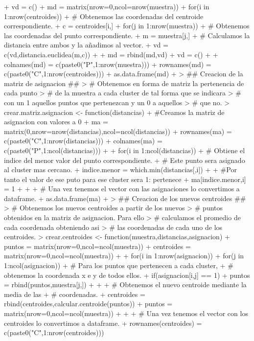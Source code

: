 \documentclass [a4paper] {article}
\begin{document}
\begin{footnotesize}
\begin{Schunk}
\begin{Sinput}
{+   vd = c()
+   md = matrix(nrow=0,ncol=nrow(muestra))
+   for(i in 1:nrow(centroides)){
+     # Obtenemos las coordenadas del centroide correspondiente.
+     c = centroides[i,]
+     for(j in 1:nrow(muestra)){
+       # Obtenemos las coordenadas del punto correspondiente.
+       m = muestra[j,]
+       # Calculamos la distancia entre ambos y la añadimos al vector.
+       vd = c(vd,distancia.euclidea(m,c))
+     }
+     md = rbind(md,vd)
+     vd = c()
+   }
+   colnames(md) = c(paste0("P",1:nrow(muestra)))
+   rownames(md) = c(paste0("C",1:nrow(centroides)))
+   as.data.frame(md)
+ }
> ## Creacion de la matriz de asignacion ##
> # Obtenemos en forma de matriz la pertenencia de cada punto
> # de la muestra a cada cluster de tal forma que se indicara
> # con un 1 aquellos puntos que pertenezcan y un 0 a aquellos
> # que no.
> crear.matriz.asignacion <- function(distancias){
+   #Creamos la matriz de asignacion con valores a 0
+   ma = matrix(0,nrow=nrow(distancias),ncol=ncol(distancias))
+   rownames(ma) = c(paste0("C",1:nrow(distancias)))
+   colnames(ma) = c(paste0("P",1:ncol(distancias)))
+ 
+   for(i in 1:ncol(distancias)){
+     # Obtiene el indice del menor valor del punto correspondiente.
+     # Este punto sera asignado al cluster mas cercano.
+     indice.menor = which.min(distancias[,i])
+ 
+     #Por tanto el valor de ese puto para ese cluster sera 1: pertenece
+     ma[indice.menor,i] = 1
+   }
+ 
+   # Una vez tenemos el vector con las asignaciones lo convertimos a dataframe.
+   as.data.frame(ma)
+ }
> ## Creacion de los nuevos centroides ##
> # Obtenemos los nuevos centroides a partir de los nuevos
> # puntos obtenidos en la matriz de asignacion. Para ello
> # calculamos el promedio de cada coordenada obteniendo asi
> # las coordenadas de cada uno de los centroides.
> crear.centroides <- function(muestra,distancias,asignacion){
+   puntos = matrix(nrow=0,ncol=ncol(muestra))
+   centroides = matrix(nrow=0,ncol=ncol(muestra))
+ 
+   for(i in 1:nrow(asignacion)){
+     for(j in 1:ncol(asignacion)){
+       # Para los puntos que pertenecen a cada cluster,
+       # obtenemos la coordenada x e y de todos ellos.
+       if(asignacion[i,j] == 1){
+         puntos = rbind(puntos,muestra[j,])
+       }
+     }
+     # Obtenemos el nuevo centroide mediante la media de las
+     # coordenadas.
+     centroides = rbind(centroides,calcular.centroide(puntos))
+     puntos = matrix(nrow=0,ncol=ncol(muestra))
+   }
+ 
+   # Una vez tenemos el vector con los centroides lo convertimos a dataframe.
+   rownames(centroides) = c(paste0("C",1:nrow(centroides)))
}
\end{Sinput}
\end{Schunk}
\end{footnotesize}
\end{document}
